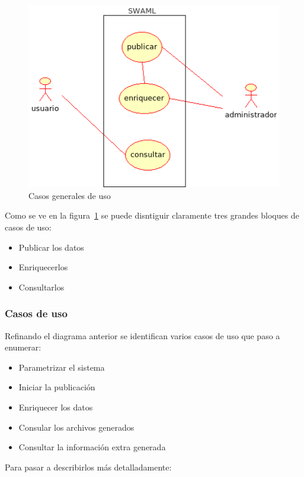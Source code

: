 \begin{figure}[ht]
 	\centering
	\includegraphics[width=12cm]{images/uml/casos-uso/general.png}
	\caption{Casos generales de uso}
	\label{fig:uml:casos-uso}
\end{figure}

Como se ve en la figura~\ref{fig:uml:casos-uso} se puede disntiguir claramente
tres grandes bloques de casos de uso:

\begin{itemize}
 \item Publicar los datos
 \item Enriquecerlos
 \item Consultarlos
\end{itemize}

\subsubsection{Casos de uso}\label{sec:casos-uso}

Refinando el diagrama anterior se identifican varios casos de uso que paso a
enumerar:

\begin{itemize}
 \item Parametrizar el sistema
 \item Iniciar la publicación
 \item Enriquecer los datos
 \item Consular los archivos generados
 \item Consultar la información extra generada
\end{itemize}

Para pasar a describirlos más detalladamente:

